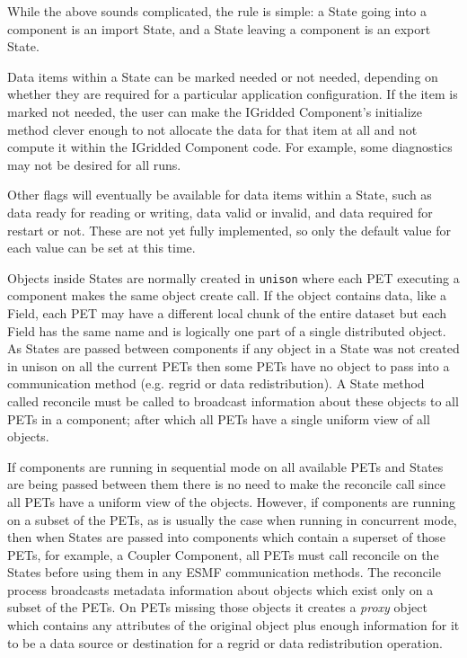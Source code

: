 While the above sounds complicated, the rule is simple:
a State going into a component is an import State, and a 
State leaving a component is an export State.

Data items within a State can be marked needed or not needed,
depending on whether they are required for a particular 
application configuration.  If the item is marked not needed,
the user can make the IGridded Component's initialize method 
clever enough to not allocate the data for that item at all
and not compute it within the IGridded Component code.
For example, some diagnostics may not be desired for all 
runs.

Other flags will eventually be available for data items within 
a State, such as data ready for reading or writing, data valid or 
invalid, and data required for restart or not.  These are not
yet fully implemented, so only the default value for each value 
can be set at this time.

Objects inside States are normally created in {\tt unison} where
each PET executing a component makes the same object create call.
If the object contains data, like a Field, each PET may have a
different local chunk of the entire dataset but each Field has
the same name and is logically one part of a single distributed 
object.   As States are passed between components if any object
in a State was not created in unison on all the current PETs 
then some PETs have no object to pass into a
communication method (e.g. regrid or data redistribution).
A State method called reconcile must be called to broadcast 
information about these objects to all PETs in a component;
after which all PETs have a single uniform view of all objects.  

If components are running in sequential mode on all available PETs
and States are being passed between them there is no need to make
the reconcile call since all PETs have a uniform view of the objects.
However, if components are running on a subset of the PETs, as is
usually the case when running in concurrent mode, then when States
are passed into components which contain a superset of those PETs,
for example, a Coupler Component, all PETs must call reconcile
on the States before using them in any ESMF communication methods.
The reconcile process broadcasts metadata information about objects
which exist only on a subset of the PETs.  On PETs missing those
objects it creates a {\it proxy} object which contains any
attributes of the original object plus enough information for it
to be a data source or destination for a regrid or data redistribution
operation. 


